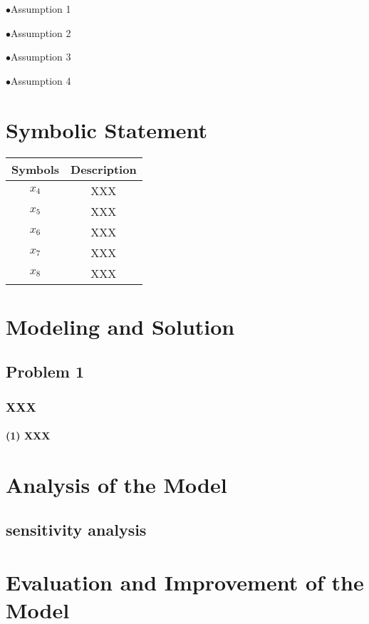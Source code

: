 \documentclass[a4paper,12pt]{article}
\begin{document}
\begin{CJK*}{GBK}{song}
$\bullet$\quad Assumption 1

$\bullet$\quad Assumption 2

$\bullet$\quad Assumption 3

$\bullet$\quad Assumption 4


\section{Symbolic Statement}
\begin{table}[!htbp]
\centering
\begin{supertabular}{c|c}\hline
Symbols & Description \\ \hline
\hline
$x_4$    & XXX   \\
$x_5$    & XXX   \\
$x_6$    & XXX   \\
$x_7$    & XXX   \\
$x_8$    & XXX   \\ \hline
\end{supertabular}
\end{table}

\section{Modeling and Solution}

\subsection{Problem 1}

\subsubsection{XXX}
\paragraph{(1) XXX} 


\section{Analysis of the Model}

\subsection{sensitivity analysis}



\section{Evaluation and Improvement of the Model}


\end{CJK*}
\end{document}
